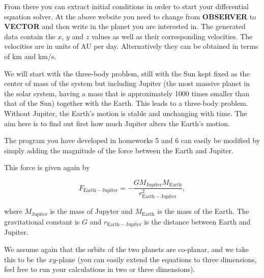 \documentclass[%
oneside,                 %
final,                   %
10pt]{article}
\begin{document}
From there you can extract initial conditions in order to start your
differential equation solver.  At the above website you need to change
from \textbf{OBSERVER} to \textbf{VECTOR} and then write in the planet you are
interested in.  The generated data contain the $x$, $y$ and $z$ values
as well as their corresponding velocities. The velocities are in units
of AU per day.  Alternatively they can be obtained in terms of km and
km/s.

We will start with  the three-body problem, still with the Sun kept
fixed as the center of mass of the system but including Jupiter (the
most massive planet in the solar system, having a mass that is
approximately 1000 times smaller than that of the Sun) together with
the Earth. This leads to a three-body problem. Without Jupiter, the
Earth's motion is stable and unchanging with time. The aim here is to
find out first how much Jupiter alters the Earth's motion.

The program you have developed in homeworks 5 and 6 can easily be modified by
simply adding the magnitude of the force between the Earth and
Jupiter.

This force is given again by

\[
F_{\mathrm{Earth-Jupiter}}=-\frac{GM_{\mathrm{Jupiter}}M_{\mathrm{Earth}}}{r_{\mathrm{Earth-Jupiter}}^2},
\]

where $M_{\mathrm{Jupiter}}$ is the mass of Jupyter and
$M_{\mathrm{Earth}}$ is the mass of the Earth.  The gravitational constant
is $G$ and $r_{\mathrm{Earth-Jupiter}}$ is the distance between Earth
and Jupiter.

We assume again that the orbits of the two planets are co-planar, and
we take this to be the $xy$-plane (you can easily extend the equations
to three dimensions, feel free to run your calculations in two or three dimensions).
\end{document}

